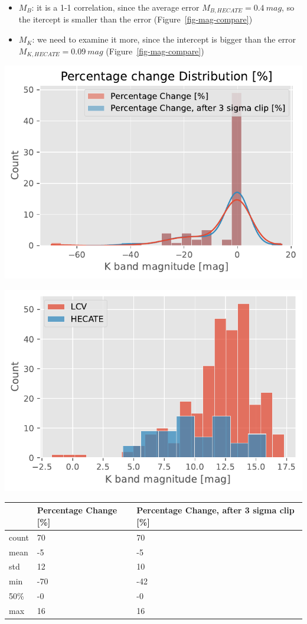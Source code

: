 \documentclass[
]{article}
\providecommand{\tightlist}{%
  \setlength{\itemsep}{0pt}\setlength{\parskip}{0pt}}\usepackage{longtable,booktabs,array}
\begin{document}
\begin{itemize}
\tightlist
\item
  \(M_B\): it is a 1-1 correlation, since the average error
  \(M_{B,HECATE} = 0.4\ mag\), so the itercept is smaller than the error
  (Figure~\ref{fig-mag-compare})
\item
  \(M_K\): we need to examine it more, since the intercept is bigger
  than the error \(M_{K,HECATE} = 0.09\ mag\)
  (Figure~\ref{fig-mag-compare})
\end{itemize}

\includegraphics{compare_files/figure-pdf/cell-26-output-1.pdf}

\includegraphics{compare_files/figure-pdf/cell-26-output-2.pdf}

\begin{longtable}[]{@{}lll@{}}
\toprule\noalign{}
& Percentage Change {[}\%{]} & Percentage Change, after 3 sigma clip
{[}\%{]} \\
\midrule\noalign{}
\endhead
\bottomrule\noalign{}
\endlastfoot
count & 70 & 70 \\
mean & -5 & -5 \\
std & 12 & 10 \\
min & -70 & -42 \\
50\% & -0 & -0 \\
max & 16 & 16 \\
\end{longtable}
\end{document}
